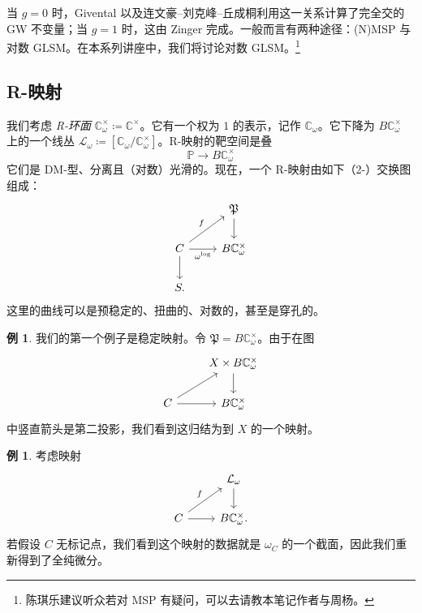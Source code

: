\documentclass{amsart}
\theoremstyle{definition}
\newtheorem{exm}[thm]{例}
\theoremstyle{remark}
\theoremstyle{plain}
\theoremstyle{definition}
\theoremstyle{remark}
\newcommand{\C}{\mathbb{C}}
\renewcommand{\P}{\mathbb{P}}
\newcommand{\mc}[1]{\mathcal{#1}}
\newcommand{\mf}[1]{\mathfrak{#1}}
\newcommand{\1}{\mathbf{1}}
\newcommand{\2}{\mathbf{2}}
\newcommand{\3}{\mathbf{3}}
\begin{document}
当 \(g = 0\) 时，Givental 以及连文豪–刘克峰–丘成桐利用这一关系计算了完全交的 GW 不变量；当 \(g = 1\) 时，这由 Zinger 完成。一般而言有两种途径：(N)MSP 与对数 GLSM。在本系列讲座中，我们将讨论对数 GLSM。\footnote{陈琪乐建议听众若对 MSP 有疑问，可以去请教本笔记作者与周杨。}

\subsection{R-映射}%
\label{sub:R-maps}

我们考虑 \textit{R-环面} \(\C^{\times}_{\omega} \coloneqq \C^{\times}\)。它有一个权为 \(1\) 的表示，记作 \(\C_{\omega}\)。它下降为 \(B \C_{\omega}^{\times}\) 上的一个线丛 \(\mc{L}_{\omega} \coloneqq [\C_{\omega} / \C^{\times}_{\omega}]\)。R-映射的靶空间是叠
\[ \P \to B \C^{\times}_{\omega} \]
它们是 DM-型、分离且（对数）光滑的。现在，一个 R-映射由如下（2-）交换图组成：
\begin{equation*}
\begin{tikzcd}
    & \mf{P} \ar{d} \\
    C \ar{ur}{f} \ar{r}[swap]{\omega^{\log}} \ar{d} & B \C_{\omega}^{\times} \\
    S.
\end{tikzcd}
\end{equation*}
这里的曲线可以是预稳定的、扭曲的、对数的，甚至是穿孔的。

\begin{exm}
    我们的第一个例子是稳定映射。令 \(\mf{P} = B\C_{\omega}^{\times}\)。由于在图
    \begin{equation*}
    \begin{tikzcd}
        & X \times B\C_{\omega}^{\times} \ar{d} \\
        C \ar{ur} \ar{r} & B \C_{\omega}^{\times}
    \end{tikzcd}
    \end{equation*}
    中竖直箭头是第二投影，我们看到这归结为到 \(X\) 的一个映射。
\end{exm}

\begin{exm}
    考虑映射
    \begin{equation*}
    \begin{tikzcd}
        & \mc{L}_{\omega} \ar{d} \\
        C \ar{ur}{f} \ar{r} & B \C_{\omega}^{\times}.
    \end{tikzcd}
    \end{equation*}
    若假设 \(C\) 无标记点，我们看到这个映射的数据就是 \(\omega_C\) 的一个截面，因此我们重新得到了全纯微分。
\end{exm}
\end{document}
